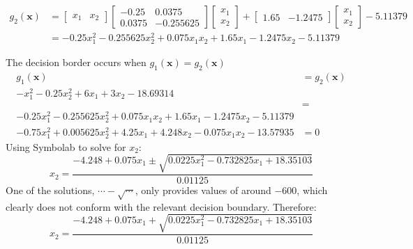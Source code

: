 \documentclass{homeworg}
\begin{document}
\begin{equation}
    \begin{aligned}
        g_2(\bm{x}) &=
        \begin{bmatrix}
            x_1 & x_2
        \end{bmatrix}
        \begin{bmatrix}
            -0.25 & 0.0375 \\
            0.0375 & -0.255625
        \end{bmatrix}
        \begin{bmatrix}
            x_1 \\ x_2
        \end{bmatrix} + 
        \begin{bmatrix}
            1.65 &
            -1.2475
        \end{bmatrix}
        \begin{bmatrix}
            x_1 \\ x_2
        \end{bmatrix} -5.11379
        \\ &=
        -0.25x_1^2-0.255625x_2^2+0.075x_1x_2+1.65x_1-1.2475x_2-5.11379
    \end{aligned}
\end{equation}

The decision border occurs when $g_1(\bm{x}) = g_2(\bm{x})$
\begin{equation}
    \begin{aligned}
        g_1(\bm{x}) &= g_2(\bm{x}) \\
        -x_1^2-0.25x_2^2+6x_1+3x_2 - 18.69314\\ &= \\-0.25x_1^2-0.255625x_2^2+0.075x_1x_2+1.65x_1-1.2475x_2-5.11379
        \\
        -0.75x_1^2 + 0.005625x_2^2 + 4.25x_1+4.248x_2-0.075x_1x_2 -13.57935
        &= 0
    \end{aligned}
\end{equation}
Using Symbolab to solve for $x_2$:
\begin{equation}
    x_2 = \frac{-4.248+0.075x_1 \pm \sqrt{0.0225x_1^2-0.732825x_1+18.35103}}{0.01125}
\end{equation}
One of the solutions, $\cdots -\sqrt{\cdots}$, only provides values of around $-600$, which clearly does not conform with the relevant decision boundary. Therefore:
\begin{equation}
    x_2 = \frac{-4.248+0.075x_1 + \sqrt{0.0225x_1^2-0.732825x_1+18.35103}}{0.01125}
\end{equation}
\end{document}
